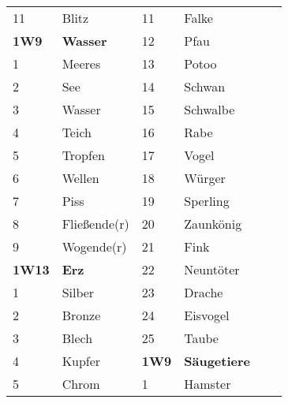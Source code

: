 \documentclass[final]{multiversum}
\begin{document}
\begin{table*}[!t]
\begin{framed}
\begin{tabular}{p{}p{}p{}p{}p{}p{}}
11            & Blitz                          & 11              & Falke                                       \\
\textbf{1W9} & \textbf{Wasser}                 & 12              & Pfau                                        \\
1             & Meeres                         & 13              & Potoo                                       \\
2             & See                            & 14              & Schwan                                      \\
3             & Wasser                         & 15              & Schwalbe                                    \\
4             & Teich                          & 16              & Rabe                                        \\
5             & Tropfen                        & 17              & Vogel                                       \\
6             & Wellen                         & 18              & Würger                                      \\
7             & Piss                           & 19              & Sperling                                    \\
8             & Flie{\ss}ende(r)               & 20              & Zaunkönig                                   \\
9             & Wogende(r)                     & 21              & Fink                                        \\
\textbf{1W13} & \textbf{Erz}                   & 22              & Neuntöter                                   \\
1             & Silber                         & 23              & Drache                                      \\
2             & Bronze                         & 24              & Eisvogel                                    \\
3             & Blech                          & 25              & Taube                                       \\
4             & Kupfer                         & \textbf{1W9}    & \textbf{Säugetiere}                         \\
5             & Chrom             	           & 1               & Hamster                                     \\

\end{tabular}
\end{framed}
\end{table*}
\end{document}
